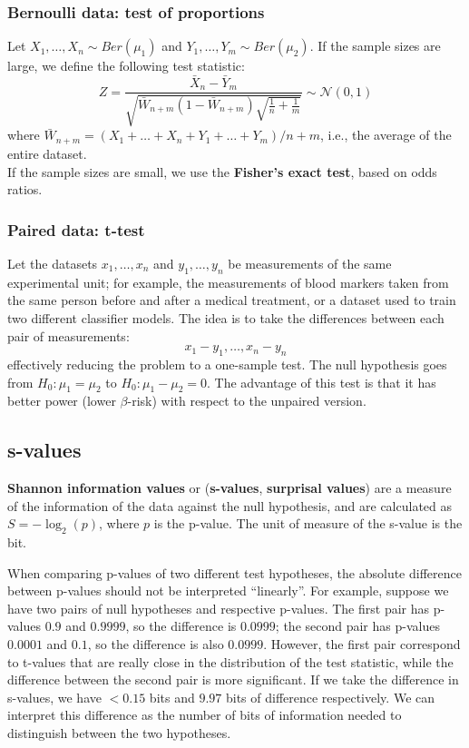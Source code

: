 \subsubsection{Bernoulli data: test of proportions}
Let $X_1, \ldots, X_n \sim Ber(\mu_1)$ and $Y_1, \ldots, Y_m \sim Ber(\mu_2)$. If the sample sizes are large, we define the following test statistic:
\begin{equation*}
    Z = \frac{\bar{X}_n - \bar{Y}_m}{\sqrt{\bar{W}_{n+m} (1 - \bar{W}_{n+m}) \sqrt{\frac{1}{n} + \frac{1}{m}}}} \sim \mathcal{N}(0,1)
\end{equation*}
where $\bar{W}_{n+m} = (X_1 + \ldots + X_n + Y_1 + \ldots + Y_m) / n+m$, i.e., the average of the entire dataset. \\
If the sample sizes are small, we use the \textbf{Fisher's exact test}, based on odds ratios.

\subsubsection{Paired data: t-test}
Let the datasets $x_1, \ldots, x_n$ and $y_1, \ldots, y_n$ be measurements of the same experimental unit; for example, the measurements of blood markers taken from the same person before and after a medical treatment, or a dataset used to train two different classifier models. The idea is to take the differences between each pair of measurements:
\begin{equation*}
    x_1 - y_1, \ldots, x_n - y_n
\end{equation*}
effectively reducing the problem to a one-sample test. The null hypothesis goes from $H_0 : \mu_1 = \mu_2$ to $H_0 : \mu_1 - \mu_2 = 0$. The advantage of this test is that it has better power (lower $\beta$-risk) with respect to the unpaired version.

\subsection{s-values}

\textbf{Shannon information values} or (\textbf{s-values}, \textbf{surprisal values}) are a measure of the information of the data against the null hypothesis, and are calculated as $S = -\log_2(p)$, where $p$ is the p-value. The unit of measure of the s-value is the bit.

When comparing p-values of two different test hypotheses, the absolute difference between p-values should not be interpreted ``linearly''. For example, suppose we have two pairs of null hypotheses and respective p-values. The first pair has p-values $0.9$ and $0.9999$, so the difference is $0.0999$; the second pair has p-values $0.0001$ and $0.1$, so the difference is also $0.0999$. However, the first pair correspond to t-values that are really close in the distribution of the test statistic, while the difference between the second pair is more significant. If we take the difference in s-values, we have $< 0.15$ bits and $9.97$ bits of difference respectively. We can interpret this difference as the number of bits of information needed to distinguish between the two hypotheses.